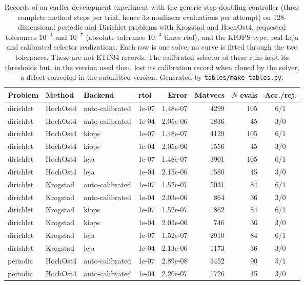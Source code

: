 \begin{table}[p]
\centering\small
\caption{Records of an earlier development experiment with the generic step-doubling controller (three complete method steps per trial, hence $3s$ nonlinear evaluations per attempt) on 128-dimensional periodic and Dirichlet problems with Krogstad and HochOst4, requested tolerances $10^{-4}$ and $10^{-7}$ (absolute tolerance $10^{-3}$ times rtol), and the KIOPS-type, real-Leja and calibrated selector realizations. Each row is one solve; no curve is fitted through the two tolerances. These are not ETD34 records. The calibrated selector of these runs kept its thresholds but, in the version used then, lost its calibration record when cloned by the solver, a defect corrected in the submitted version. Generated by \texttt{tables/make\_tables.py}.}\label{tab:phase6}
\begin{tabular}{@{}llllrrrc@{}}\toprule
Problem & Method & Backend & rtol & Error & Matvecs & $N$ evals & Acc./rej.\\\midrule
dirichlet & HochOst4 & auto-calibrated & 1e-07 & 1.48e-07 & 4299 & 105 & 6/1\\
dirichlet & HochOst4 & auto-calibrated & 1e-04 & 2.05e-06 & 1836 & 45 & 3/0\\
dirichlet & HochOst4 & kiops & 1e-07 & 1.48e-07 & 4129 & 105 & 6/1\\
dirichlet & HochOst4 & kiops & 1e-04 & 2.05e-06 & 1556 & 45 & 3/0\\
dirichlet & HochOst4 & leja & 1e-07 & 1.48e-07 & 3901 & 105 & 6/1\\
dirichlet & HochOst4 & leja & 1e-04 & 2.15e-06 & 1580 & 45 & 3/0\\
dirichlet & Krogstad & auto-calibrated & 1e-07 & 1.52e-07 & 2031 & 84 & 6/1\\
dirichlet & Krogstad & auto-calibrated & 1e-04 & 2.03e-06 & 864 & 36 & 3/0\\
dirichlet & Krogstad & kiops & 1e-07 & 1.52e-07 & 1862 & 84 & 6/1\\
dirichlet & Krogstad & kiops & 1e-04 & 2.03e-06 & 746 & 36 & 3/0\\
dirichlet & Krogstad & leja & 1e-07 & 1.52e-07 & 2910 & 84 & 6/1\\
dirichlet & Krogstad & leja & 1e-04 & 2.13e-06 & 1173 & 36 & 3/0\\
periodic & HochOst4 & auto-calibrated & 1e-07 & 2.89e-08 & 3452 & 90 & 5/1\\
periodic & HochOst4 & auto-calibrated & 1e-04 & 2.20e-07 & 1726 & 45 & 3/0\\

\end{tabular}
\end{table}
